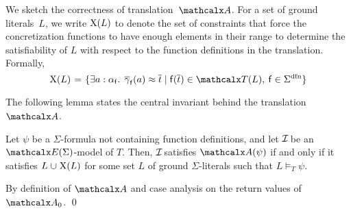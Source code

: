

We sketch the correctness of translation~$\conv$.
For a set of ground literals~$L$,
we write $\mathrm{X}( L )$ to denote the set of constraints that
force the concretization functions to have enough elements in their range 
to determine the satisfiability of $L$ with respect to the function
definitions in the translation.
Formally,
\begin{equation} \label{eq:xl}
\absconstraints( L ) \vthinspace=\vthinspace \smash{\{ \exists a : {\fargtype{\con{f}}}.\;\, \vecfarg{\con{f}}( a ) \teq \nobreak \vec t
\nobreak\mid\allowbreak \con{f}( \vec t ) \in \terms( L ),\: \con{f} \in \sfundefs{\Sigma}
\}}
\end{equation}

The following lemma states the central invariant behind the translation $\conv$.

\begin{lemma}\label{lem:conv}
Let $\psi$ be a $\Sigma$-formula not containing function definitions,
and let $\mathcal{I\!}$ be an $\extendsig{\Sigma}$-model of $T$.
Then, $\mathcal{I\!}$ satisfies $\conv( \psi )$ if and only if
it satisfies $L \cup \absconstraints( L )$
for some set $L$ of ground $\Sigma$-literals such that $L \models_T \psi$.
\end{lemma}
\begin{proofsketch}
By definition of $\conv$ and case analysis on the return values of $\conv_0$.
\qed
\end{proofsketch}

